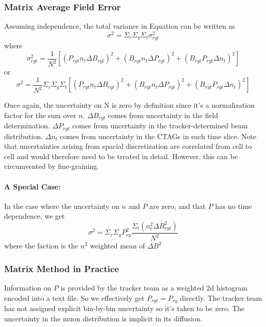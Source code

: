 \documentclass[twoside]{article}
\begin{document}
\subsubsection{Matrix Average Field Error}
Assuming independence, the total variance in Equation \label{dis} can be written as
\begin{equation}
	\sigma^2 = 
	\Sigma_r \Sigma_y \Sigma_t \sigma^2_{ryt}
\end{equation}
where 
\begin{equation}
 \sigma^2_{ryt} = \frac{1}{N^2} [( P_{ryt} n_t \Delta B_{ryt})^2  + (B_{ryt} n_t\Delta P_{ryt})^2 + (B_{ryt} P_{ryt}\Delta n_{t})^2]
\end{equation}
or 
\begin{equation}
\boxed{
\sigma^2 = 
\frac{1}{N^2} \Sigma_r \Sigma_y \Sigma_t  [( P_{ryt} n_t \Delta B_{ryt})^2  + (B_{ryt} n_t\Delta P_{ryt})^2 + (B_{ryt} P_{ryt}\Delta n_{t})^2]
}
\end{equation}

Once again, the uncertainty on N is zero by definition since it's a normalization factor for the sum over $n$. $\Delta B_{ryt}$ comes from uncertainty in the field determination. $\Delta P_{ryt}$ comes from uncertainty in the tracker-determined beam distribution.  $\Delta n_{t}$ comes from uncertainty in the CTAGs in each time slice. Note that uncertainties arising from spacial discretization are correlated from cell to cell and would therefore need to be treated in detail. However, this can be circumvented by fine-graining. 



\paragraph{A Special Case:}
In the case where the uncertainty on $n$ and $P$ are zero, and that $P$ has no time dependence, we get
\begin{equation}
	\sigma^2 = 
	\Sigma_r \Sigma_y P^2_{ry} \frac{\Sigma_t  ( n^2_t \Delta B^2_{ryt})}{{N^2} }
\end{equation}
where the faction is the $n^2$ weighted mean of $\Delta B^2$

\subsubsection{Matrix Method in Practice}
Information on $P$ is provided by the tracker team as a weighted 2d histogram encoded into a text file. So we effectively get $P_{ryt} = P_{ry}$ directly. The tracker team has not assigned explicit bin-by-bin uncertainty so it's taken to be zero. The uncertainty in the muon distribution is implicit in its diffusion.
\end{document}
